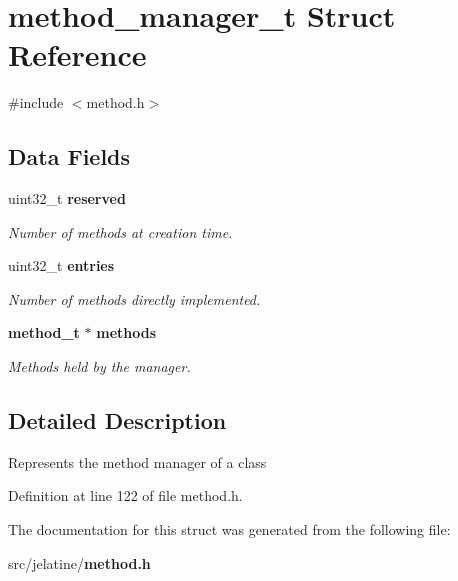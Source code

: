 \section{method\_\-manager\_\-t Struct Reference}
\label{structmethod__manager__t}


{\ttfamily \#include $<$method.h$>$}

\subsection*{Data Fields}
\begin{DoxyCompactItemize}
\item 
uint32\_\-t {\bf reserved}\label{structmethod__manager__t_abc20d5aef5d0a5d6777b05ca7c3553fa}

\begin{DoxyCompactList}\small\item\em Number of methods at creation time. \item\end{DoxyCompactList}\item 
uint32\_\-t {\bf entries}\label{structmethod__manager__t_a1d155d37d873eb51c6e596c05d70ce60}

\begin{DoxyCompactList}\small\item\em Number of methods directly implemented. \item\end{DoxyCompactList}\item 
{\bf method\_\-t} $\ast$ {\bf methods}\label{structmethod__manager__t_ab74dca6d08fb975c99bcf026b9ea3831}

\begin{DoxyCompactList}\small\item\em Methods held by the manager. \item\end{DoxyCompactList}\end{DoxyCompactItemize}


\subsection{Detailed Description}
Represents the method manager of a class 

Definition at line 122 of file method.h.



The documentation for this struct was generated from the following file:\begin{DoxyCompactItemize}
\item 
src/jelatine/{\bf method.h}\end{DoxyCompactItemize}
